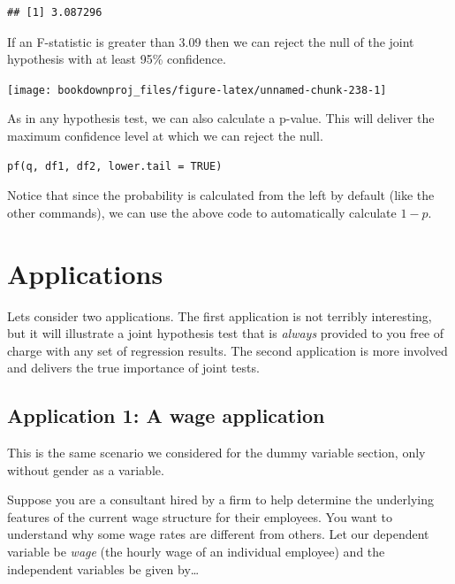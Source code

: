 \documentclass[
]{book}
\begin{document}
\begin{verbatim}
## [1] 3.087296
\end{verbatim}

If an F-statistic is greater than 3.09 then we can reject the null of the joint hypothesis with at least 95\% confidence.

\begin{center}\texttt{[image: bookdownproj\_files/figure-latex/unnamed-chunk-238-1]} \end{center}

As in any hypothesis test, we can also calculate a p-value. This will deliver the maximum confidence level at which we can reject the null.

\begin{verbatim}
pf(q, df1, df2, lower.tail = TRUE)
\end{verbatim}

Notice that since the probability is calculated from the left by default (like the other commands), we can use the above code to automatically calculate \(1-p\).

\section{Applications}\label{applications}

Lets consider two applications. The first application is not terribly interesting, but it will illustrate a joint hypothesis test that is \emph{always} provided to you free of charge with any set of regression results. The second application is more involved and delivers the true importance of joint tests.

\subsection*{Application 1: A wage application}\label{application-1-a-wage-application}

This is the same scenario we considered for the dummy variable section, only without gender as a variable.

Suppose you are a consultant hired by a firm to help determine the underlying features of the current wage structure for their employees. You want to understand why some wage rates are different from others. Let our dependent variable be \emph{wage} (the hourly wage of an individual employee) and the independent variables be given by\ldots{}
\end{document}
